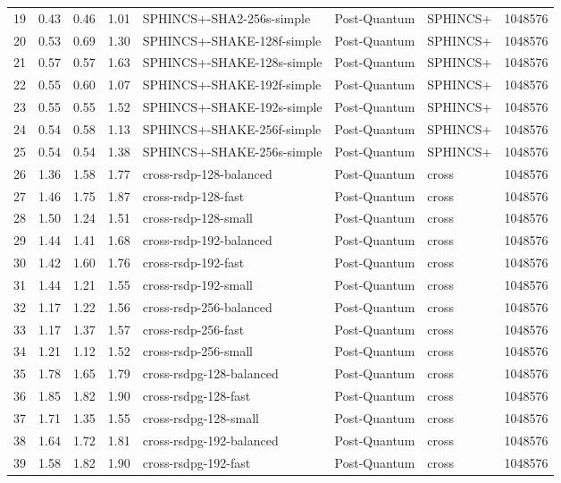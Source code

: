 \begin{table}
\begin{tabular}{lrrrlllr}
19 & 0.43 & 0.46 & 1.01 & SPHINCS+-SHA2-256s-simple & Post-Quantum & SPHINCS+ & 1048576 \\
20 & 0.53 & 0.69 & 1.30 & SPHINCS+-SHAKE-128f-simple & Post-Quantum & SPHINCS+ & 1048576 \\
21 & 0.57 & 0.57 & 1.63 & SPHINCS+-SHAKE-128s-simple & Post-Quantum & SPHINCS+ & 1048576 \\
22 & 0.55 & 0.60 & 1.07 & SPHINCS+-SHAKE-192f-simple & Post-Quantum & SPHINCS+ & 1048576 \\
23 & 0.55 & 0.55 & 1.52 & SPHINCS+-SHAKE-192s-simple & Post-Quantum & SPHINCS+ & 1048576 \\
24 & 0.54 & 0.58 & 1.13 & SPHINCS+-SHAKE-256f-simple & Post-Quantum & SPHINCS+ & 1048576 \\
25 & 0.54 & 0.54 & 1.38 & SPHINCS+-SHAKE-256s-simple & Post-Quantum & SPHINCS+ & 1048576 \\
26 & 1.36 & 1.58 & 1.77 & cross-rsdp-128-balanced & Post-Quantum & cross & 1048576 \\
27 & 1.46 & 1.75 & 1.87 & cross-rsdp-128-fast & Post-Quantum & cross & 1048576 \\
28 & 1.50 & 1.24 & 1.51 & cross-rsdp-128-small & Post-Quantum & cross & 1048576 \\
29 & 1.44 & 1.41 & 1.68 & cross-rsdp-192-balanced & Post-Quantum & cross & 1048576 \\
30 & 1.42 & 1.60 & 1.76 & cross-rsdp-192-fast & Post-Quantum & cross & 1048576 \\
31 & 1.44 & 1.21 & 1.55 & cross-rsdp-192-small & Post-Quantum & cross & 1048576 \\
32 & 1.17 & 1.22 & 1.56 & cross-rsdp-256-balanced & Post-Quantum & cross & 1048576 \\
33 & 1.17 & 1.37 & 1.57 & cross-rsdp-256-fast & Post-Quantum & cross & 1048576 \\
34 & 1.21 & 1.12 & 1.52 & cross-rsdp-256-small & Post-Quantum & cross & 1048576 \\
35 & 1.78 & 1.65 & 1.79 & cross-rsdpg-128-balanced & Post-Quantum & cross & 1048576 \\
36 & 1.85 & 1.82 & 1.90 & cross-rsdpg-128-fast & Post-Quantum & cross & 1048576 \\
37 & 1.71 & 1.35 & 1.55 & cross-rsdpg-128-small & Post-Quantum & cross & 1048576 \\
38 & 1.64 & 1.72 & 1.81 & cross-rsdpg-192-balanced & Post-Quantum & cross & 1048576 \\
39 & 1.58 & 1.82 & 1.90 & cross-rsdpg-192-fast & Post-Quantum & cross & 1048576 \\

\end{tabular}
\end{table}
